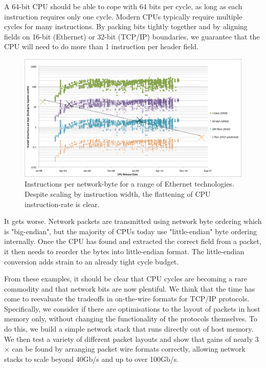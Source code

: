 A 64-bit CPU should be able to cope with 64 bits per cycle, as long as each instruction requires only one cycle. %
Modern CPUs typically require multiple cycles for many instructions.
By packing bits tightly together and by aligning fields on 16-bit (Ethernet) or 32-bit (TCP/IP) boundaries, we guarantee that the CPU will need to do more than 1 instruction per header field. 


\begin{figure}
 \centering
 \includegraphics[width=1\columnwidth]{figures/cpu/ips-figure.png}
 \caption{Instructions per network-byte for a range of Ethernet technologies. Despite scaling by instruction width, the flattening of CPU instruction-rate is clear.  }
 \label{f:ips-figure}
\end{figure}



It gets worse. 
Network packets are transmitted using network byte ordering which is "big-endian", but the majority of CPUs today use "little-endian" byte ordering internally. 
Once the CPU has found and extracted the correct field from a packet, it then needs to reorder the bytes into little-endian format. %
The little-endian conversion adds strain to an already tight cycle budget.


From these examples, it should be clear that CPU cycles are becoming a rare commodity and that network bits are now plentiful. We think that the time has come to reevaluate the tradeoffs in on-the-wire formats for TCP/IP protocols. 
Specifically, we consider if there are optimisations to the layout of packets in host memory only, without changing the functionality of the protocols themselves. 
To do this, we build a simple network stack that runs directly out of host memory. 
We then test a variety of different packet layouts and show that gains of nearly 3$\times{}$ can be found by arranging packet wire formats correctly, allowing network stacks to scale beyond 40Gb/s and up to over 100Gb/s. 


